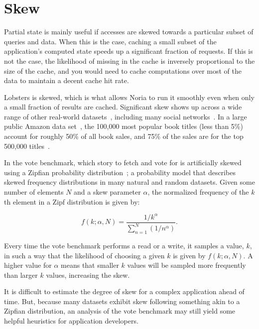 \section{Skew}
\label{s:eval:patterns}

Partial state is mainly useful if accesses are skewed towards a particular
subset of queries and data. When this is the case, caching a small subset of the
application's computed state speeds up a significant fraction of requests. If
this is not the case, the likelihood of missing in the cache is inversely
proportional to the size of the cache, and you would need to cache computations
over most of the data to maintain a decent cache hit rate.

Lobsters is skewed, which is what allows Noria to run it smoothly even when only
a small fraction of results are cached. Significant skew shows up across a wide
range of other real-world datasets~\cite{power1, power2, network-skew,
large-skew-analysis}, including many social networks~\cite{network-skew2,
community-skew}. In a large public Amazon data set~\cite{amazon-skew}, the
100,000 most popular book titles (less than 5\%) account for roughly 50\% of all
book sales, and 75\% of the sales are for the top 500,000
titles~\cite{zhang2020permutation}.

In the vote benchmark, which story to fetch and vote for is artificially
skewed using a Zipfian probability distribution~\cite{zipf}; a probability model
that describes skewed frequency distributions in many natural and random
datasets. Given some number of elements $N$ and a skew parameter $\alpha$, the
normalized frequency of the $k$th element in a Zipf distribution is given by:

\begin{displaymath}
  f\left(k;\alpha,N\right)={\frac {1/k^{\alpha}}{\sum \limits _{n=1}^{N}(1/n^{\alpha})}}.
\end{displaymath}

Every time the vote benchmark performs a read or a write, it samples a value,
$k$, in such a way that the likelihood of choosing a given $k$ is given by
$f\left(k;\alpha,N\right)$. A higher value for $\alpha$ means that smaller $k$
values will be sampled more frequently than larger $k$ values, increasing the
skew.

It is difficult to estimate the degree of skew for a complex application ahead
of time. But, because many datasets exhibit skew following something akin to a
Zipfian distribution, an analysis of the vote benchmark may still yield some
helpful heuristics for application developers.

